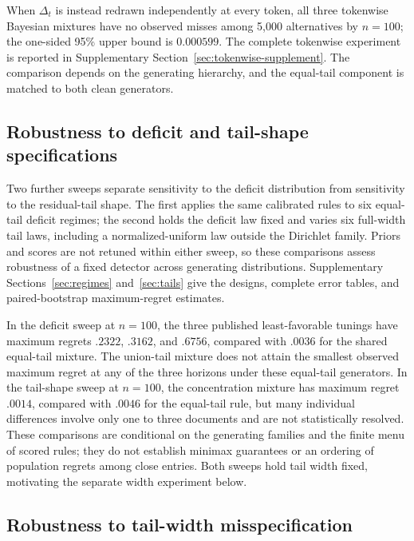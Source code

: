 \documentclass[11pt]{article}
\begin{document}
When $\Delta_t$ is instead redrawn independently at every token, all three tokenwise Bayesian mixtures have no observed misses among 5,000 alternatives by $n=100$; the one-sided 95\% upper bound is $0.000599$.  The complete tokenwise experiment is reported in Supplementary Section~\ref{sec:tokenwise-supplement}.  The comparison depends on the generating hierarchy, and the equal-tail component is matched to both clean generators.

\FloatBarrier
\subsection{Robustness to deficit and tail-shape specifications}
\label{sec:synthetic-sensitivity}

Two further sweeps separate sensitivity to the deficit distribution from
sensitivity to the residual-tail shape.  The first applies the same calibrated
rules to six equal-tail deficit regimes; the second holds the deficit law fixed
and varies six full-width tail laws, including a normalized-uniform law outside
the Dirichlet family.  Priors and scores are not retuned within either sweep, so these comparisons assess robustness of a fixed detector across generating distributions.
Supplementary Sections~\ref{sec:regimes} and~\ref{sec:tails} give the designs,
complete error tables, and paired-bootstrap maximum-regret estimates.

In the deficit sweep at $n=100$, the three published least-favorable tunings
have maximum regrets $.2322$, $.3162$, and $.6756$, compared with $.0036$ for
the shared equal-tail mixture.  The union-tail mixture does not attain the smallest observed maximum regret
at any of the three horizons under these equal-tail generators.  In the tail-shape sweep at
$n=100$, the concentration mixture has maximum regret $.0014$, compared with
$.0046$ for the equal-tail rule, but many individual differences involve only
one to three documents and are not statistically resolved.  These comparisons
are conditional on the generating families and the finite menu of scored rules;
they do not establish minimax guarantees or an ordering of population regrets
among close entries.  Both sweeps hold tail width fixed, motivating the
separate width experiment below.

\subsection{Robustness to tail-width misspecification}
\label{sec:tail-width-sweep}
\end{document}
